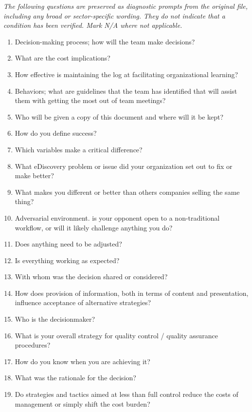 \documentclass[10pt,letterpaper]{article}
\newcommand{\docsection}[1]{\par\Needspace{5\baselineskip}\vspace{8pt}{\large\sffamily\bfseries\color{navy}#1}\par\vspace{2pt}{\color{rulegrey}\rule{\linewidth}{.6pt}}\par}
\begin{document}
\docsection{03 \quad Source diagnostic checklist}
\textit{The following questions are preserved as diagnostic prompts from the original file, including any broad or sector-specific wording. They do not indicate that a condition has been verified. Mark N/A where not applicable.}
\begingroup\small\begin{enumerate}[leftmargin=2.1em, itemsep=4pt]
\item[1.] Decision-making process; how will the team make decisions?
\item[2.] What are the cost implications?
\item[3.] How effective is maintaining the log at facilitating organizational learning?
\item[4.] Behaviors; what are guidelines that the team has identified that will assist them with getting the most out of team meetings?
\item[5.] Who will be given a copy of this document and where will it be kept?
\item[6.] How do you define success?
\item[7.] Which variables make a critical difference?
\item[8.] What eDiscovery problem or issue did your organization set out to fix or make better?
\item[9.] What makes you different or better than others companies selling the same thing?
\item[10.] Adversarial environment. is your opponent open to a non-traditional workflow, or will it likely challenge anything you do?
\item[11.] Does anything need to be adjusted?
\item[12.] Is everything working as expected?
\item[13.] With whom was the decision shared or considered?
\item[14.] How does provision of information, both in terms of content and presentation, influence acceptance of alternative strategies?
\item[15.] Who is the decisionmaker?
\item[16.] What is your overall strategy for quality control / quality assurance procedures?
\item[17.] How do you know when you are achieving it?
\item[18.] What was the rationale for the decision?
\item[19.] Do strategies and tactics aimed at less than full control reduce the costs of management or simply shift the cost burden?

\end{enumerate}
\end{document}
